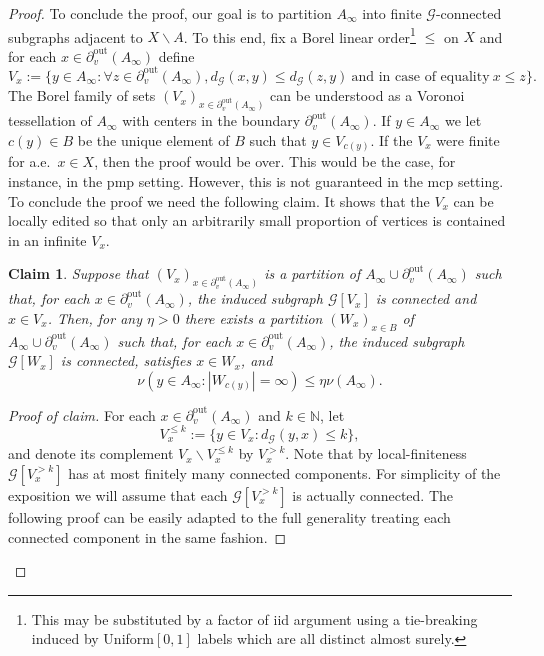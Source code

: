 \documentclass[letterpaper,11pt,reqno]{amsart}
\theoremstyle{bfnote}
\newtheorem{claim}[theorem]{Claim}
\theoremstyle{definition}
\newcommand{\0}{\varnothing}
\renewcommand{\leq}{\leqslant}
\numberwithin{equation}{section}
\begin{document}
\begin{proof}
    To conclude the proof, our goal is to partition $A_\infty$ into finite $\mathcal G$-connected subgraphs adjacent to $X\backslash A$.  To this end, fix a Borel linear order\footnote{This may be substituted by a factor of iid argument using a tie-breaking induced by Uniform$[0,1]$ labels which are all distinct almost surely.} $\leq$ on $X$ and for each $x \in \partial_v^{\mathrm{out}} (A_\infty)$ define 
    \begin{equation}\label{eq:voronoi}
        V_{x} := \{ y \in A_\infty : \forall z \in \partial_v^{\mathrm{out}} (A_\infty), d_{\mathcal{G}} (x,y) \leq d _{\mathcal{G}} (z,y)\ \text{and in case of equality}\ x \leq z\}.
    \end{equation}
    The Borel family of sets $(V_{x})_{x\in \partial_v^{\mathrm{out}} (A_\infty)}$ can be understood as a Voronoi tessellation of $A_\infty$ with centers in the boundary $\partial_v^{\mathrm{out}} (A_\infty)$. If $y \in A_\infty$ we let $c(y) \in B$ be the unique element of $B$ such that $y\in V_{c(y)}$. If the $V_{x}$ were finite for a.e.\ $x\in X$, then the proof would be over. This would be the case, for instance, in the pmp setting. However, this is not guaranteed in the mcp setting. To conclude the proof we need the following claim. It shows that the $V_x$ can be locally edited so that only an arbitrarily small proportion of vertices is contained in an infinite $V_x$. 

    \begin{claim}\label{claim:partition}
        Suppose that $(V_x)_{x\in \partial_v^{\mathrm{out}} (A_\infty)}$ is a partition of $A_\infty \cup \partial_v^{\mathrm{out}} (A_\infty)$ such that, for each $x\in \partial_v^{\mathrm{out}} (A_\infty)$, the induced subgraph $\mathcal G[V_x]$ is connected and $x\in V_x$. Then, for any $\eta > 0$ there exists a partition $(W_x)_{x\in B}$ of $A_\infty \cup \partial_v^{\mathrm{out}} (A_\infty)$ such that, for each $x\in \partial_v^{\mathrm{out}} (A_\infty)$, the induced subgraph $\mathcal G[W_{x}]$ is connected, satisfies $x\in W_x$, and 
        $$
            \nu\left(y \in A_\infty :  |W_{c(y)}|=\infty\right)\leq \eta \nu (A_\infty).
        $$
    \end{claim}

    \begin{proof}[Proof of claim]
     For each $x\in \partial_v^{\mathrm{out}} (A_\infty)$ and $k\in \mathbb N$, let $$
     V_x^{\leq k}:= \{y\in V_x : d_{\mathcal G} (y,x) \leq k\},
     $$
     and denote its complement $V_x \backslash V_{x}^{\leq k}$ by $V_x^{> k}$. Note that by local-finiteness $\mathcal G [V_x^{>k}]$ has at most finitely many connected components. For simplicity of the exposition we will assume that each $\mathcal G[V_x^{>k}]$ is actually connected. The following proof can be easily adapted to the full generality treating each connected component in the same fashion. 
     

\end{proof}
\end{proof}
\end{document}
